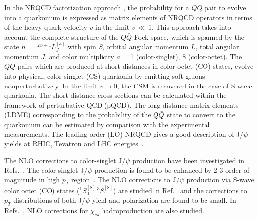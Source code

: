 \documentclass[aps,prc,preprint,superscriptaddress,showpacs,showkeys,amsmath]{revtex4-1}
\begin{document}
  In the NRQCD factorization approach \cite{Bodwin:1994jh},
the probability for a $Q\bar Q$ pair to evolve into a quarkonium is expressed
as matrix elements of NRQCD operators in terms of the heavy-quark velocity 
$v$ in the limit $v\,\ll\,1$. This approach takes into account the complete structure of 
the $Q\bar Q$ Fock space, which is spanned by the state $n\,=\,^{2S+1}L_{J}^{[a]}$ 
with spin $S$, orbital angular momentum $L$, total angular momentum $J$, 
and color multiplicity $a$ = 1 (color-singlet), 8 (color-octet). 
 The $Q\bar Q$ pairs which are produced at short distances in color-octet (CO) states, 
evolve into physical, color-singlet (CS) quarkonia by emitting soft gluons 
nonperturbatively.
 In the limit $v\rightarrow0$, the CSM is recovered in the case of S-wave quarkonia.
 The short distance cross sections can be calculated within the 
framework of perturbative QCD (pQCD). The long distance matrix elements (LDME) 
corresponding to the probability of the $Q{\bar{Q}}$ state to convert to the quarkonium 
can be estimated by comparison with the experimental measurements. 
  The leading order (LO) NRQCD gives a good description of J/$\psi$ yields at 
RHIC, Tevatron and LHC energies~\cite{Sharma:2012dy}.

  The NLO corrections to color-singlet J/$\psi$ production have been investigated 
in Refs.~\cite{Campbell:2007ws,Gong:2008sn}. The color-singlet J/$\psi$ 
production is found to be enhanced by 2-3 order of magnitude in high 
$p_T$ region~\cite{Gong:2008sn}.
 The NLO corrections to J/$\psi$ production via S-wave 
color octet (CO) states ($^1S_{0}^{[8]}\,^3S_{1}^{[8]}$) are studied in 
Ref.~\cite{Gong:2008ft} and the corrections to $p_{T}$ distributions of both 
J/$\psi$ yield and polarization are found to be small. In Refs.~\cite{Ma:2010vd}, 
NLO corrections for $\chi_{cJ}$ hadroproduction are also studied. 
\end{document}
